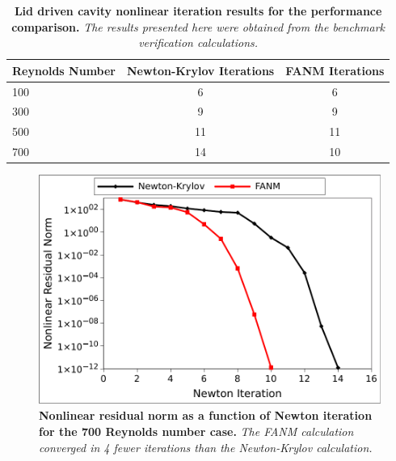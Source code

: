 \begin{table}[h!]
  \begin{center}
    \begin{tabular}{lcc}\hline\hline
      \multicolumn{1}{l}{Reynolds Number}& 
      \multicolumn{1}{c}{Newton-Krylov Iterations}&
      \multicolumn{1}{c}{FANM Iterations}\\
      \hline
      100 & 6 & 6 \\
      300 & 9 & 9 \\
      500 & 11 & 11 \\
      700 & 14 & 10 \\
      \hline\hline
    \end{tabular}
  \end{center}
  \caption{\textbf{Lid driven cavity nonlinear iteration
      results for the performance comparison.} \textit{The results
      presented here were obtained from the benchmark verification
      calculations.}}
  \label{tab:driven_nonlinear_iter_comparison}
\end{table}

\begin{figure}[htpb!]
  \begin{center}
    \includegraphics[width=6in]{chapters/nonlinear_problem/re700_convergence.pdf}
  \end{center}
  \caption{\textbf{Nonlinear residual norm as a function of Newton
      iteration for the 700 Reynolds number case.} \textit{The FANM
      calculation converged in 4 fewer iterations than the
      Newton-Krylov calculation.}}
  \label{fig:re700_convergence}
\end{figure}

